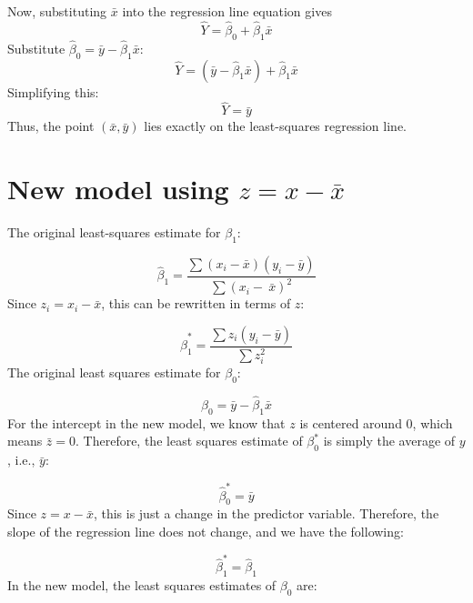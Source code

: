 Now, substituting $\bar{x}$ into the regression line equation gives
\begin{equation*}
\hat{Y} = \hat{\beta}_0 + \hat{\beta}_1 \bar{x}
\end{equation*}
Substitute $\hat{\beta}_0 = \bar{y} - \hat{\beta}_1 \bar{x}$:
\begin{equation*}
\hat{Y} = (\bar{y} - \hat{\beta}_1 \bar{x}) + \hat{\beta}_1 \bar{x}
\end{equation*}
Simplifying this:
\begin{equation*}
    \hat{Y} = \bar{y}
\end{equation*}
Thus, the point $(\bar{x}, \bar{y})$ lies exactly on the least-squares regression
line.

\section{New model using \texorpdfstring{$z = x - \bar{x}$}{z = x - x-bar}}

The original least-squares estimate for $\beta_1$:

\begin{equation*}
    \hat{\beta}_1 = \frac{\sum (x_i - \bar{x})(y_i - \bar{y})}{\sum (x_i -\
    \bar{x})^2}
\end{equation*}
Since $z_i = x_i - \bar{x}$, this can be rewritten in terms of $z$:

\begin{equation*}
    \hat{\beta}_1^* = \frac{\sum z_i (y_i - \bar{y})}{\sum z_i^2}
\end{equation*}
The original least squares estimate for $\beta_0$:

\begin{equation*}
    \hat{\beta}_0 = \bar{y} - \hat{\beta}_1\bar{x}
\end{equation*}
For the intercept in the new model, we know that $z$ is centered around 0,
which means $\bar{z} = 0$. Therefore, the least squares estimate of $\beta_0^*$
is simply the average of $y$, i.e., $\bar{y}$:

\begin{equation*}
    \hat{\beta}_0^* = \bar{y}
\end{equation*}
Since $z = x - \bar{x}$, this is just a change in the predictor variable.
Therefore, the slope of the regression line does not change, and we have the
following:

\begin{equation*}
\hat{\beta}_1^* = \hat{\beta}_1
\end{equation*}
In the new model, the least squares estimates of $\beta_0$ are:

